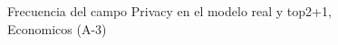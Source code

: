 \begin{figure}[H]
    \centering
    
    \caption{Frecuencia del campo Privacy en el modelo real y top2+1, Economicos (A-3)}
    \label{frecuency-Privacy-top2+1}
\end{figure}